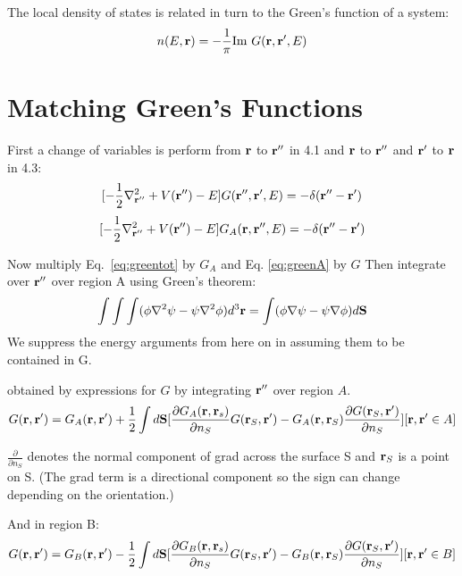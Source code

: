 \documentclass{article}
\def\r{{\bf r}}
\begin{document}
The local density of states is related in turn to the Green's function of a system:
%
\begin{equation}
n(E,\r) = -\frac{1}{\pi}{\rm Im}~G(\r,\r',E)
\end{equation}
%

\section{Matching Green's Functions}
First a change of variables is perform from $\r$ to $\r''$ in 4.1 and $\r$ to $\r''$ and $\r'$
to $\r$ in 4.3:
%
\begin{equation}
\label{eq:greentot}
[-\frac{1}{2}\nabla^{2}_{\r''} + V(\r'') - E]G(\r'',\r',E)= -\delta(\r''-\r')
\end{equation}
%
\begin{equation}
\label{eq:greenA}
[-\frac{1}{2}\nabla^{2}_{\r''} + V(\r'') - E]G_{A}(\r,\r'',E)= -\delta(\r''-\r')
\end{equation}

Now multiply Eq.~\ref{eq:greentot} by $G_{A}$ and Eq.
\ref{eq:greenA} by $G$ Then integrate over $\r''$ over region A using
Green's theorem:
%
\begin{equation}
\label{eq:greenthm}
\int\int\int(\phi\nabla^{2}\psi - \psi\nabla^{2}\phi)d^{3}\r 
= \int(\phi\nabla\psi-\psi\nabla\phi)d{\mathbf{S}}
\end{equation}
%
We suppress the energy arguments from here on in assuming them to be contained in G. 

obtained by expressions for $G$ by integrating $\r''$ over region $A$.
%
\begin{equation}
\label{eq:green1a}
G(\r,\r') = G_{A}(\r,\r') + \frac{1}{2} \int d\mathbf{S} 
[\frac{\partial G_{A}(\r,\r_{s})}{\partial n_{S}}G(\r_{S},\r') - G_{A}(\r,\r_{S})\frac{\partial G(\r_{S},\r')}{\partial n_{S}}] [\r, \r' \in A]
\end{equation}

$\frac{\partial}{\partial n_{S}}$ denotes the normal component of grad across
the surface S and $\r_{S}$ is a point on S. (The grad term is a directional component
so the sign can change depending on the orientation.)

And in region B:
%
\begin{equation}
\label{eq:green1b}
G(\r,\r') = G_{B}(\r,\r') - \frac{1}{2} \int d\mathbf{S} 
[\frac{\partial G_{B}(\r,\r_{s})}{\partial n_{S}}G(\r_{S},\r')
- G_{B}(\r,\r_{S})\frac{\partial G(\r_{S},\r')}{\partial n_{S}}] [\r, \r' \in B]
\end{equation}
%
\end{document}
